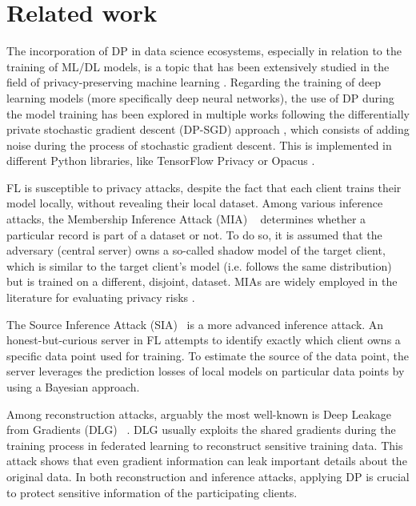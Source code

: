\section{Related work}
\label{sec:sota}

The incorporation of DP in data science ecosystems, especially in relation to the training of ML/DL models, is a topic that has been extensively studied in the field of privacy-preserving machine learning \cite{pan2024differential}. Regarding the training of deep learning models (more specifically deep neural networks), the use of DP during the model training has been explored in multiple works following the differentially private stochastic gradient descent (DP-SGD) approach \cite{abadi2016deep, ha2019differential, xie2021differential}, which consists of adding noise during the process of stochastic gradient descent. This is implemented in different Python libraries, like TensorFlow Privacy \cite{tensorflow2015-whitepaper} or Opacus \cite{Opacus}. 

FL is susceptible to privacy attacks, despite the fact that each client trains their model locally, without revealing their local dataset.
Among various inference attacks, the Membership Inference Attack (MIA)  ~\cite{nasr2019comprehensive,mia_attack,carlini2022membership} determines whether a particular record is part of a dataset or not.  To do so, it is assumed that the adversary (central server) owns a so-called shadow model of the target client, which is similar to the target client’s model (i.e. follows the same distribution) but is trained on a different, disjoint, dataset.
MIAs are widely employed in the literature for evaluating privacy risks \cite{10.1145/3523273}.

The Source Inference Attack (SIA)~\cite{sia_paper} is a more advanced inference attack. An honest-but-curious server in FL attempts to identify exactly which client owns a specific data point used for training. To estimate the source of the data point, the server leverages the prediction losses of local models on particular data points by using a Bayesian approach. 


Among reconstruction attacks, arguably the most well-known is Deep Leakage from Gradients (DLG) ~\cite{DLG}. DLG usually exploits the shared gradients during the training process in federated learning to reconstruct sensitive training data. This attack shows that even gradient information can leak important details about the original data. In both reconstruction and inference attacks, applying DP is crucial to protect sensitive information of the participating clients.

